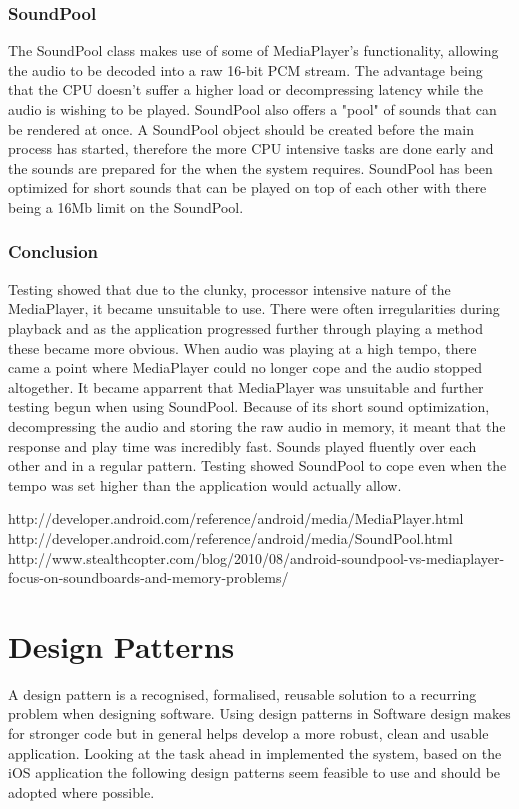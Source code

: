 \documentclass{l4proj}
\begin{document}
\subsubsection{SoundPool} The SoundPool class makes use of some of MediaPlayer's functionality, allowing the audio to be decoded into a raw 16-bit PCM stream.  The advantage being that the CPU doesn't suffer  a higher load or decompressing latency while the audio is wishing to be played. SoundPool also offers a "pool" of sounds that can be rendered at once.  A SoundPool object should be created before the main process has started, therefore the more CPU intensive tasks are done early and the sounds are prepared for the when the system requires.  SoundPool has been optimized for short sounds that can be played on top of each other with there being a 16Mb limit on the SoundPool.

\subsubsection{Conclusion}
Testing showed that due to the clunky, processor intensive nature of the MediaPlayer, it became unsuitable to use.  There were often irregularities during playback and as the application progressed further through playing a method these became more obvious. When audio was playing at a high tempo, there came a point where MediaPlayer could no longer cope and the audio stopped altogether. It became apparrent that MediaPlayer was unsuitable and further testing begun when using SoundPool.  Because of its short sound optimization, decompressing the audio and storing the raw audio in memory, it meant that the response and play time was incredibly fast.  Sounds played fluently over each other and in a regular pattern. Testing showed SoundPool to cope even when the tempo was set higher than the application would actually allow. 


http://developer.android.com/reference/android/media/MediaPlayer.html
http://developer.android.com/reference/android/media/SoundPool.html
http://www.stealthcopter.com/blog/2010/08/android-soundpool-vs-mediaplayer-focus-on-soundboards-and-memory-problems/


\section{Design Patterns}
A design pattern is a recognised, formalised, reusable solution to a recurring problem when designing software. Using design patterns in Software design makes for stronger code but in general helps develop a more robust, clean and usable application.  Looking at the task ahead in implemented the system, based on the iOS application the following design patterns seem feasible to use and should be adopted where possible.
\end{document}
